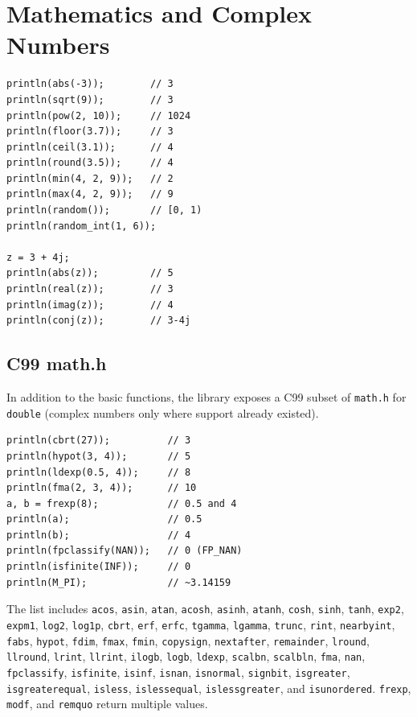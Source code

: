\documentclass[11pt,a4paper,oneside]{report}
\newcommand{\code}[1]{\texttt{#1}}
\newcommand{\file}[1]{\texttt{#1}}
\begin{document}
\section{Mathematics and Complex Numbers}
\begin{lstlisting}
println(abs(-3));        // 3
println(sqrt(9));        // 3
println(pow(2, 10));     // 1024
println(floor(3.7));     // 3
println(ceil(3.1));      // 4
println(round(3.5));     // 4
println(min(4, 2, 9));   // 2
println(max(4, 2, 9));   // 9
println(random());       // [0, 1)
println(random_int(1, 6));

z = 3 + 4j;
println(abs(z));         // 5
println(real(z));        // 3
println(imag(z));        // 4
println(conj(z));        // 3-4j
\end{lstlisting}

\subsection*{C99 math.h}
In addition to the basic functions, the library exposes a C99 subset of
\file{math.h} for \code{double} (complex numbers only where support
already existed).

\begin{lstlisting}
println(cbrt(27));          // 3
println(hypot(3, 4));       // 5
println(ldexp(0.5, 4));     // 8
println(fma(2, 3, 4));      // 10
a, b = frexp(8);            // 0.5 and 4
println(a);                 // 0.5
println(b);                 // 4
println(fpclassify(NAN));   // 0 (FP_NAN)
println(isfinite(INF));     // 0
println(M_PI);              // ~3.14159
\end{lstlisting}

The list includes \code{acos}, \code{asin}, \code{atan}, \code{acosh},
\code{asinh}, \code{atanh}, \code{cosh}, \code{sinh}, \code{tanh},
\code{exp2}, \code{expm1}, \code{log2}, \code{log1p}, \code{cbrt},
\code{erf}, \code{erfc}, \code{tgamma}, \code{lgamma}, \code{trunc},
\code{rint}, \code{nearbyint}, \code{fabs}, \code{hypot}, \code{fdim},
\code{fmax}, \code{fmin}, \code{copysign}, \code{nextafter},
\code{remainder}, \code{lround}, \code{llround}, \code{lrint},
\code{llrint}, \code{ilogb}, \code{logb}, \code{ldexp}, \code{scalbn},
\code{scalbln}, \code{fma}, \code{nan}, \code{fpclassify}, \code{isfinite},
\code{isinf}, \code{isnan}, \code{isnormal}, \code{signbit},
\code{isgreater}, \code{isgreaterequal}, \code{isless},
\code{islessequal}, \code{islessgreater}, and \code{isunordered}.
\code{frexp}, \code{modf}, and \code{remquo} return multiple values.
\end{document}
